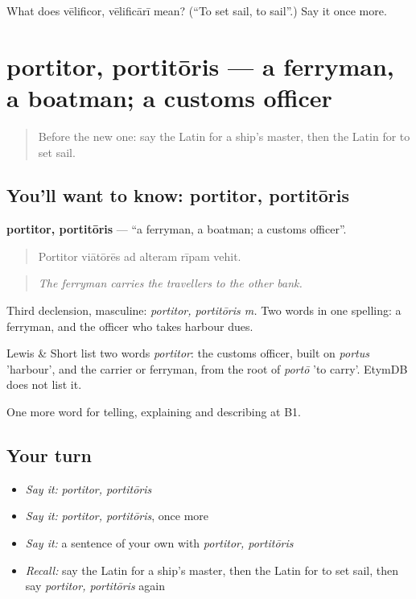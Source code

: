 \begin{tcolorbox}[breakable,colback=teal!4,colframe=teal!35!black,title={Before you move on}]
What does vēlificor, vēlificārī mean? (\textquotedblleft{}To set sail, to sail\textquotedblright{}.) Say it once more.
\end{tcolorbox}
\section[portitor, portitōris]{portitor, portitōris — a ferryman, a boatman; a customs officer}

\label{lesson:LA-C438-portitor}



\begin{quote}
Before the new one: say the Latin for a ship's master, then the Latin for to set sail.
\end{quote}

\subsection*{You'll want to know: portitor, portitōris}
\textbf{portitor, portitōris} — \textquotedblleft{}a ferryman, a boatman; a customs officer\textquotedblright{}.

\begin{quote}
Portitor viātōrēs ad alteram rīpam vehit.
\end{quote}

\begin{quote}
\emph{The ferryman carries the travellers to the other bank.}
\end{quote}

Third declension, masculine: \emph{portitor, portitōris m.} Two words in one spelling: a ferryman, and the officer who takes harbour dues.

\begin{cousinweb}
Lewis \& Short list two words \emph{portitor}: the customs officer, built on \emph{portus} 'harbour', and the carrier or ferryman, from the root of \emph{portō} 'to carry'. EtymDB does not list it.
\end{cousinweb}

\begin{grammarlens}[title={What you've built}]
One more word for telling, explaining and describing at B1.
\end{grammarlens}

\subsection*{Your turn}
\begin{itemize}
\raggedright
  \item \emph{Say it:} \emph{portitor, portitōris}
  \item \emph{Say it:} \emph{portitor, portitōris}, once more
  \item \emph{Say it:} a sentence of your own with \emph{portitor, portitōris}
  \item \emph{Recall:} say the Latin for a ship's master, then the Latin for to set sail, then say \emph{portitor, portitōris} again
\end{itemize}

